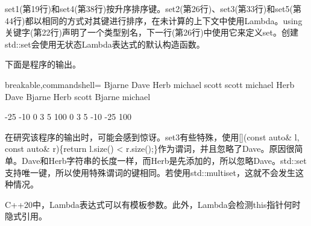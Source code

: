 set1(第19行)和set4(第38行)按升序排序键。set2(第26行)、set3(第33行)和set5(第44行)都以相同的方式对其键进行排序，在未计算的上下文中使用Lambda。using关键字(第22行)声明了一个类型别名，下一行(第26行)中使用它来定义set。创建std::set会使用无状态Lambda表达式的默认构造函数。

下面是程序的输出。

\begin{tcblisting}{breakable,commandshell={}}
Bjarne Dave Herb michael scott
scott michael Herb Dave Bjarne
Herb scott Bjarne michael

-25 -10 0 3 5 100
0 3 5 -10 -25 100
\end{tcblisting}

在研究该程序的输出时，可能会感到惊讶。set3有些特殊，使用[](const auto\& l, const auto\& r)\{return l.size() < r.size();\}作为谓词，并且忽略了Dave。原因很简单。Dave和Herb字符串的长度一样，而Herb是先添加的，所以忽略Dave。std::set支持唯一键，所以使用特殊谓词的键相同。若使用std::multiset，这就不会发生这种情况。

\begin{tcolorbox}[breakable,enhanced jigsaw,colback=mygreen!5!white,colframe=mygreen!75!black,title={总结}]
C++20中，Lambda表达式可以有模板参数。此外，Lambda会检测this指针何时隐式引用。
\end{tcolorbox}

\newpage








